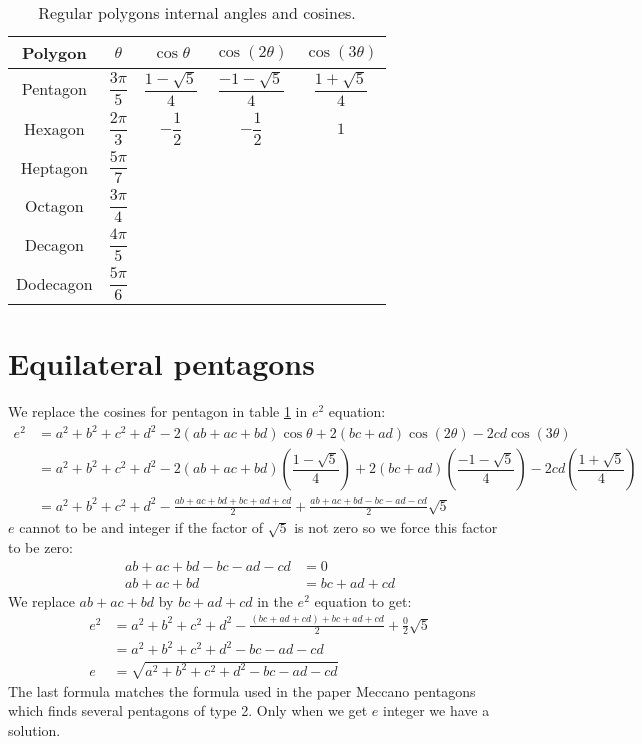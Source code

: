 \documentclass[11pt]{article}
\begin{document}
\begin{table}[h]
\centering
\begin{tabular}{|c c c c c|}\hline
Polygon & $\theta$ & $\cos\theta$ & $\cos(2\theta)$ & $\cos(3\theta)$ \rule[-2ex]{0pt}{6ex}\\ \hline\hline 
Pentagon & $\dfrac{3\pi}{5}$ & $\dfrac{1-\sqrt{5}}{4}$ & $\dfrac{-1-\sqrt{5}}{4}$ & $\dfrac{1+\sqrt{5}}{4}$\rule[-2ex]{0pt}{6ex}\\ \hline
Hexagon & $\dfrac{2\pi}{3}$ & $-\dfrac{1}{2}$ & $-\dfrac{1}{2}$ & $1$ \rule[-2ex]{0pt}{6ex}\\ \hline
Heptagon & $\dfrac{5\pi}{7}$ &  &  & \rule[-2ex]{0pt}{6ex}\\ \hline
Octagon & $\dfrac{3\pi}{4}$ &  &  & \rule[-2ex]{0pt}{6ex}\\ \hline
Decagon & $\dfrac{4\pi}{5}$ &  &  & \rule[-2ex]{0pt}{6ex}\\ \hline
Dodecagon & $\dfrac{5\pi}{6}$ &  &  & \rule[-2ex]{0pt}{6ex}\\ \hline

\end{tabular}
\caption{Regular polygons internal angles and cosines.}
\label{tbl:polygons}
\end{table}

\section{Equilateral pentagons}

We replace the cosines for pentagon in table \ref{tbl:polygons} in $e^2$ equation:
\begin{align}
e^2 &= a^2 +b^2 +c^2 +d^2 -2(ab+ac+bd)\cos\theta +2(bc+ad)\cos(2\theta) -2cd\cos(3\theta) \nonumber\\
 &= a^2 +b^2 +c^2 +d^2
  -2(ab+ac+bd)\left(\dfrac{1-\sqrt{5}}{4}\right)
  +2(bc+ad)\left(\dfrac{-1-\sqrt{5}}{4}\right)
  -2cd\left(\dfrac{1+\sqrt{5}}{4}\right) \nonumber\\
 &= a^2 +b^2 +c^2 +d^2 -\frac{ab+ac+bd+bc+ad+cd}{2} +\frac{ab+ac+bd-bc-ad-cd}{2}\sqrt{5}
\end{align}
$e$ cannot to be and integer if the factor of $\sqrt{5}$ is not zero so we force this factor to be zero:
\begin{align}
 ab+ac+bd-bc-ad-cd &= 0\nonumber\\
 ab+ac+bd &= bc+ad+cd
\end{align}
We replace $ab+ac+bd$ by $bc+ad+cd$ in the $e^2$ equation to get:
\begin{align}
e^2 &= a^2 +b^2 +c^2 +d^2 -\frac{(bc+ad+cd)+bc+ad+cd}{2} +\frac{0}{2}\sqrt{5} \nonumber\\
 &= a^2 +b^2 +c^2 +d^2 -bc -ad -cd \nonumber\\
e &= \sqrt{a^2 +b^2 +c^2 +d^2 -bc -ad -cd}
\end{align}
The last formula matches the formula used in the paper Meccano pentagons which finds several pentagons of type 2. 
Only when we get $e$ integer we have a solution.
\end{document}

